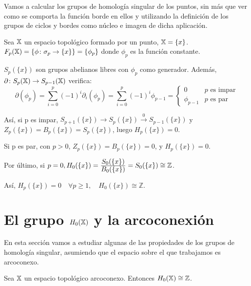Vamos a calcular los grupos de homología singular de los puntos, sin más que ver como se comporta la función borde
en ellos y utilizando la definición de los grupos de ciclos y bordes como núcleo e imagen de dicha aplicación.

Sea ${\mathbb X}$ un espacio topológico formado por un punto, ${\mathbb X} = \{x\}$.
$F_{p}({\mathbb X}) = \{ \phi \colon \sigma_p \to \{x\} \} = \{\phi_p\}$ donde $\phi_p$ es la función constante.

$S_p({\{x\}})$ son grupos abelianos libres con $\phi_p$ como generador. Además, $\partial \colon S_{p}({\mathbb X}) \to S_{p-1}({\mathbb X})$ verifica:
\[\partial(\phi_p) = \sum_{i = 0}^p (-1)^i \partial_i(\phi_p) =  \sum_{i = 0}^p (-1)^i \phi_{p-1} = \begin{cases}
                                                                                                            0 & p \text{ es impar} \\
                                                                                                            \phi_{p-1} & p \text{ es par}
                                                                                                    \end{cases}   \]

Así, si p es impar, $S_{p+1}(\{x\}) \to S_p(\{x\}) \xrightarrow{0} S_{p-1}(\{x\})$ y $Z_p(\{x\}) = B_p(\{x\}) = S_p(\{x\})$, luego
$H_p(\{x\}) = 0$.

Si p es par, con $p > 0$, $Z_p(\{x\}) = B_p(\{x\}) = 0$, y $H_p(\{x\}) = 0$.

Por último, si $ p = 0, H_0(\{x\}) = \frac{\displaystyle S_0(\{x\})}{\displaystyle B_0(\{x\})} = S_0(\{x\}) \cong \mathbb Z$.

Así, $H_p(\{x\}) = 0 \hspace{1em} \forall p \geq 1, \hspace{1em} H_0(\{x\}) \cong \mathbb Z$.

\section{El grupo $H_0({\mathbb X})$ y la arcoconexión}

En esta sección vamos a estudiar algunas de las propiedades de los grupos de homología singular, asumiendo que el espacio
sobre el que trabajamos es arcoconexo.

\begin{proposition}
  Sea ${\mathbb X}$ un espacio topológico arcoconexo. Entonces $H_0({\mathbb X}) \cong \mathbb Z$.
\end{proposition}

